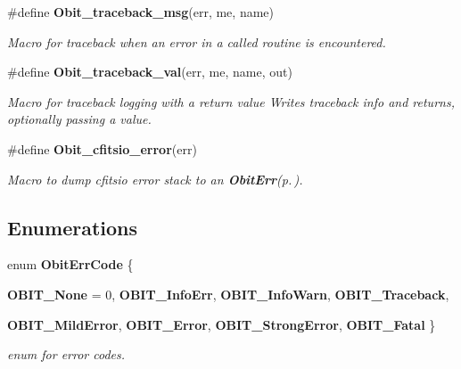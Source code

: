 \begin{CompactItemize}
\#define {\bf Obit\_\-traceback\_\-msg}(err, me, name)
\begin{CompactList}\small\item\em Macro for traceback when an error in a called routine is encountered. \item\end{CompactList}\item 
\#define {\bf Obit\_\-traceback\_\-val}(err, me, name, out)
\begin{CompactList}\small\item\em Macro for traceback logging with a return value Writes traceback info and returns, optionally passing a value. \item\end{CompactList}\item 
\#define {\bf Obit\_\-cfitsio\_\-error}(err)
\begin{CompactList}\small\item\em Macro to dump cfitsio error stack to an {\bf Obit\-Err}{\rm (p.\,\pageref{structObitErr})}. \item\end{CompactList}\end{CompactItemize}
\subsection*{Enumerations}
\begin{CompactItemize}
\item 
enum {\bf Obit\-Err\-Code} \{ \par
{\bf OBIT\_\-None} =  0, 
{\bf OBIT\_\-Info\-Err}, 
{\bf OBIT\_\-Info\-Warn}, 
{\bf OBIT\_\-Traceback}, 
\par
{\bf OBIT\_\-Mild\-Error}, 
{\bf OBIT\_\-Error}, 
{\bf OBIT\_\-Strong\-Error}, 
{\bf OBIT\_\-Fatal}
 \}
\begin{CompactList}\small\item\em enum for error codes. \item\end{CompactList}\end{CompactItemize}
